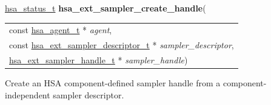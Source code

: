 \documentclass[final]{book}
\newcommand{\hsaarg}[1]{\textit{#1}}
\begin{document}
\noindent\begin{tcolorbox}[breakable,nobeforeafter,colframe=white,colback=lightgray,left=0mm]
\hyperlink{group__status_1gad755322e7ff95456520e8abdbe90d225}{hsa_status_t} \hypertarget{group__images_1gad7b12bd999916b5799406ce58aa86dab}{\textbf{hsa_ext_sampler_create_handle}}(
\vspace{-3.5mm}\begin{longtable}{@{}p{\textwidth}}
\hspace{1.7em}const \hyperlink{group__topology_1gab8db3fb886332a24acac08ec361e1d86}{hsa_agent_t} * \hsaarg{agent},\\
\hspace{1.7em}const \hyperlink{group__images_1ga4d5e53a9c2225305ab307cdbfa3cbbd2}{hsa_ext_sampler_descriptor_t} * \hsaarg{sampler_descriptor},\\
\hspace{1.7em}\hyperlink{group__images_1gaecb49fbe45d4fdb66c93fc82936cbc71}{hsa_ext_sampler_handle_t} * \hsaarg{sampler_handle})\end{longtable}

\end{tcolorbox}
Create an HSA component-defined sampler handle from a component-independent sampler descriptor.
\end{document}
